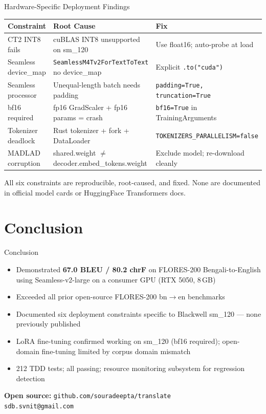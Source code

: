 \documentclass[aspectratio=169,10pt]{beamer}
\begin{document}
\begin{frame}{Hardware-Specific Deployment Findings}
  \small
  \begin{table}
  \begin{tabular}{p{3.5cm}p{4.5cm}p{4cm}}
    \toprule
    Constraint & Root Cause & Fix \\
    \midrule
    CT2 INT8 fails & cuBLAS INT8 unsupported on sm\_120 & Use float16; auto-probe at load \\
    Seamless device\_map & \texttt{SeamlessM4Tv2ForTextToText} no device\_map & Explicit \texttt{.to("cuda")} \\
    Seamless processor & Unequal-length batch needs padding & \texttt{padding=True, truncation=True} \\
    bf16 required & fp16 GradScaler + fp16 params = crash & \texttt{bf16=True} in TrainingArguments \\
    Tokenizer deadlock & Rust tokenizer + fork + DataLoader & \texttt{TOKENIZERS\_PARALLELISM=false} \\
    MADLAD corruption & shared.weight $\ne$ decoder.embed\_tokens.weight & Exclude model; re-download cleanly \\
    \bottomrule
  \end{tabular}
  \end{table}
  All six constraints are reproducible, root-caused, and fixed.
  None are documented in official model cards or HuggingFace Transformers docs.
\end{frame}

\section{Conclusion}

\begin{frame}{Conclusion}
  \begin{itemize}
    \item Demonstrated \textbf{67.0 BLEU / 80.2 chrF} on FLORES-200 Bengali-to-English
          using Seamless-v2-large on a consumer GPU (RTX 5050, 8\,GB)
    \item Exceeded all prior open-source FLORES-200 bn$\to$en benchmarks
    \item Documented six deployment constraints specific to Blackwell sm\_120 ---
          none previously published
    \item LoRA fine-tuning confirmed working on sm\_120 (bf16 required);
          open-domain fine-tuning limited by corpus domain mismatch
    \item 212 TDD tests; all passing; resource monitoring subsystem for regression detection
  \end{itemize}
  \vspace{0.3cm}
  \begin{center}
    \textbf{Open source:} \texttt{github.com/souradeepta/translate}\\
    \texttt{sdb.svnit@gmail.com}
  \end{center}
\end{frame}
\end{document}
